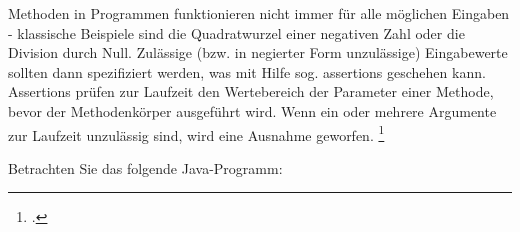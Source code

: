 \documentclass{lehramt-informatik-aufgabe}
\begin{document}

Methoden in Programmen funktionieren nicht immer für alle möglichen
Eingaben - klassische Beispiele sind die Quadratwurzel einer negativen
Zahl oder die Division durch Null. Zulässige (bzw. in negierter Form
unzulässige) Eingabewerte sollten dann spezifiziert werden, was mit
Hilfe sog. assertions geschehen kann. Assertions prüfen zur Laufzeit den
Wertebereich der Parameter einer Methode, bevor der Methodenkörper
ausgeführt wird. Wenn ein oder mehrere Argumente zur Laufzeit unzulässig
sind, wird eine Ausnahme geworfen.
\footcite{examen:66116:2019:09}

\bigskip

\noindent
Betrachten Sie das folgende Java-Programm:

\end{document}
